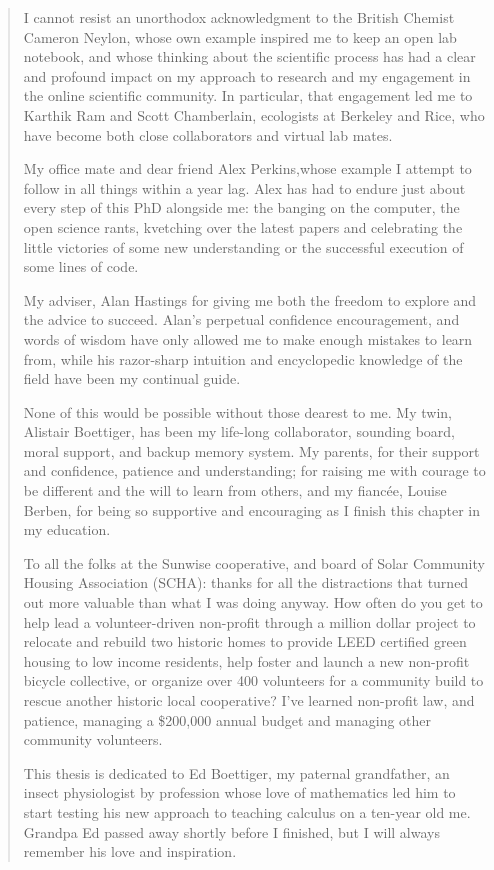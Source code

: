 \begin{quote}
I cannot resist an unorthodox acknowledgment to the British Chemist Cameron Neylon, whose own example inspired me to keep an open lab notebook, and whose thinking about the scientific process has had a clear and profound impact on my approach to research and my engagement in the online scientific community. In particular, that engagement led me to Karthik Ram and Scott Chamberlain, ecologists at Berkeley and Rice, who have become both close collaborators and virtual lab mates. 

My office mate and dear friend Alex Perkins,whose example I attempt to follow in all things within a year lag.  Alex has had to endure just about every step of this PhD alongside me: the banging on the computer, the open science rants, kvetching over the latest papers and celebrating the little victories of some new understanding or the successful execution of some lines of code.  

My adviser, Alan Hastings for giving me both the freedom to explore and the advice to succeed.  Alan's perpetual confidence encouragement, and words of wisdom have only allowed me to make enough mistakes to learn from, while his razor-sharp intuition and encyclopedic knowledge of the field have been my continual guide. 


None of this would be possible without those dearest to me.  My twin, Alistair Boettiger, has been my life-long collaborator, sounding board, moral support, and backup memory system.  My parents, for their support and confidence, patience and understanding; for raising me with courage to be different and the will to learn from others, and my fianc\'ee, Louise Berben, for being so supportive and encouraging as I finish this chapter in my education. 

To all the folks at the Sunwise cooperative, and board of Solar Community Housing Association (SCHA): thanks for all the distractions that turned out more valuable than what I was doing anyway.  How often do you get to help lead a volunteer-driven non-profit through a million dollar project to relocate and rebuild two historic homes to provide LEED certified green housing to low income residents, help foster and launch a new non-profit bicycle collective, or organize over 400 volunteers for a community build to rescue another historic local cooperative?  I've learned non-profit law, and patience, managing a \$200,000 annual budget and managing other community volunteers.

This thesis is dedicated to Ed Boettiger, my paternal grandfather, an insect physiologist by profession whose love of mathematics led him to start testing his new approach to teaching calculus on a ten-year old me.  Grandpa Ed passed away shortly before I finished, but I will always remember his love and inspiration.
\end{quote}


